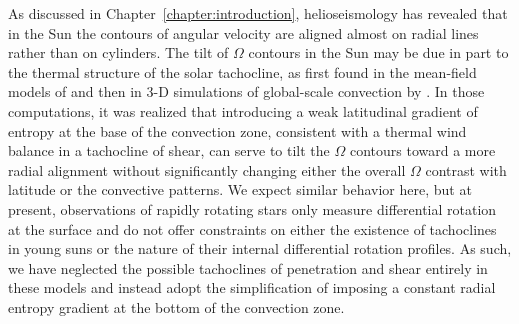 As discussed in Chapter~\ref{chapter:introduction}, 
helioseismology has revealed that in the Sun the contours of angular velocity
are aligned almost on radial lines rather than on cylinders.  The tilt
of $\Omega$ contours in the Sun may be due in part to the thermal
structure of the solar tachocline, as first found in the mean-field
models of \cite{Rempel_2005} and then in 3-D simulations  of global-scale
convection by \cite{Miesch_et_al_2006}.  In those computations, it was
realized that introducing a weak latitudinal gradient of entropy at the
base of the convection zone, consistent with a thermal wind balance in
a tachocline of shear, can serve to tilt the $\Omega$ contours
toward a more radial alignment without significantly changing either
the overall $\Omega$ contrast with latitude or the convective
patterns.  We expect similar behavior here, but at present,
observations of rapidly rotating stars only measure differential
rotation at the surface and do not offer constraints on either the
existence of tachoclines in young suns or the nature of their internal
differential rotation profiles.  As such, we have
neglected the possible tachoclines of penetration and shear entirely
in these models and instead adopt the simplification of imposing a
constant radial entropy gradient at the bottom of the convection zone.



